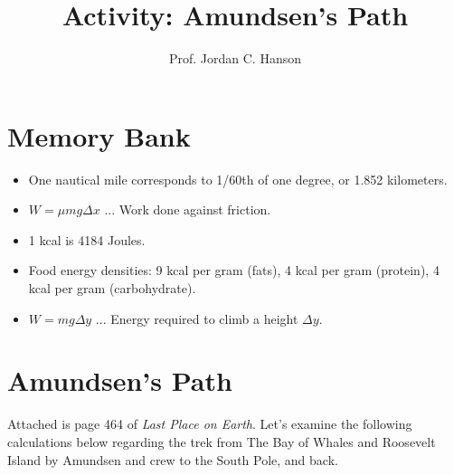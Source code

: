 \documentclass{article}
\begin{document}
\title{Activity: Amundsen's Path}
\author{Prof. Jordan C. Hanson}

\maketitle

\section{Memory Bank}

\begin{itemize}
\item One nautical mile corresponds to 1/60th of one degree, or 1.852 kilometers.
\item $W = \mu m g \Delta x$ ... Work done against friction.
\item 1 kcal is 4184 Joules.
\item Food energy densities: 9 kcal per gram (fats), 4 kcal per gram (protein), 4 kcal per gram (carbohydrate).
\item $W = mg\Delta y$ ... Energy required to climb a height $\Delta y$.
\end{itemize}

\section{Amundsen's Path}

Attached is page 464 of \textit{Last Place on Earth}.  Let's examine the following calculations below regarding the trek from The Bay of Whales and Roosevelt Island by Amundsen and crew to the South Pole, and back.
\end{document}
